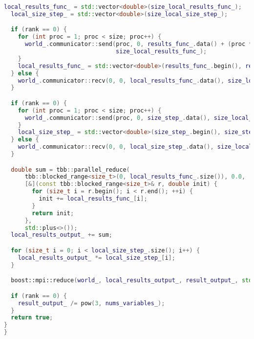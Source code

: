 \documentclass[12pt]{article}
\begin{document}
\begin{lstlisting}[language=C++]
  local_results_func_ = std::vector<double>(size_local_results_func_);
  local_size_step_ = std::vector<double>(size_local_size_step_);

  if (rank == 0) {
    for (int proc = 1; proc < size; proc++) {
      world_.communicator::send(proc, 0, results_func_.data() + (proc * size_local_results_func_),
                                size_local_results_func_);
    }
    local_results_func_ = std::vector<double>(results_func_.begin(), results_func_.begin() + size_local_results_func_);
  } else {
    world_.communicator::recv(0, 0, local_results_func_.data(), size_local_results_func_);
  }

  if (rank == 0) {
    for (int proc = 1; proc < size; proc++) {
      world_.communicator::send(proc, 0, size_step_.data(), size_local_size_step_);
    }
    local_size_step_ = std::vector<double>(size_step_.begin(), size_step_.begin() + size_local_size_step_);
  } else {
    world_.communicator::recv(0, 0, local_size_step_.data(), size_local_size_step_);
  }

  double sum = tbb::parallel_reduce(
      tbb::blocked_range<size_t>(0, local_results_func_.size()), 0.0,
      [&](const tbb::blocked_range<size_t>& r, double init) {
        for (size_t i = r.begin(); i < r.end(); ++i) {
          init += local_results_func_[i];
        }
        return init;
      },
      std::plus<>());
  local_results_output_ += sum;

  for (size_t i = 0; i < local_size_step_.size(); i++) {
    local_results_output_ *= local_size_step_[i];
  }

  boost::mpi::reduce(world_, local_results_output_, result_output_, std::plus(), 0);

  if (rank == 0) {
    result_output_ /= pow(3, nums_variables_);
  }
  return true;
}
}
\end{lstlisting}
\end{document}

